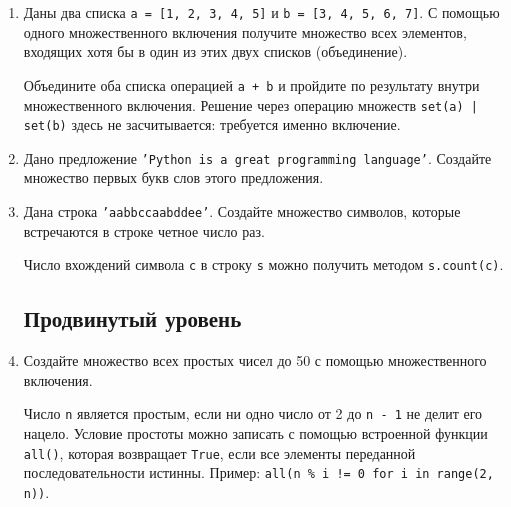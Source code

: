 \documentclass[a4,12pt]{article}
\theoremstyle{remark}
\begin{document}
\begin{enumerate}
    \begin{exercisehint}
        Метод \texttt{str.isalpha()} возвращает \texttt{True},
        если символ является буквой.
    \end{exercisehint}

    \item Даны два списка \texttt{a = [1, 2, 3, 4, 5]} и \texttt{b = [3, 4, 5, 6, 7]}.
    С помощью одного множественного включения получите множество всех элементов,
    входящих хотя бы в один из этих двух списков (объединение).

    \begin{exercisehint}
        Объедините оба списка операцией \texttt{a + b} и пройдите по результату
        внутри множественного включения. Решение через операцию множеств
        \texttt{set(a) | set(b)} здесь не засчитывается: требуется именно
        включение.
    \end{exercisehint}

    \item Дано предложение \texttt{'Python is a great programming language'}.
    Создайте множество первых букв слов этого предложения.

    \item Дана строка \texttt{'aabbccaabddee'}.
    Создайте множество символов, которые встречаются в строке четное число раз.

    \begin{exercisehint}
        Число вхождений символа \texttt{c} в строку \texttt{s} можно получить
        методом \texttt{s.count(c)}.
    \end{exercisehint}

    \subsection*{Продвинутый уровень}

    \item Создайте множество всех простых чисел до 50 с помощью
    множественного включения.

    \begin{exercisehint}
        Число \texttt{n} является простым, если ни одно число от 2 до
        \texttt{n - 1} не делит его нацело. Условие простоты можно записать
        с помощью встроенной функции \texttt{all()}, которая возвращает
        \texttt{True}, если все элементы переданной последовательности истинны.
        Пример: \texttt{all(n \% i != 0 for i in range(2, n))}.
    \end{exercisehint}


\end{enumerate}
\end{document}
